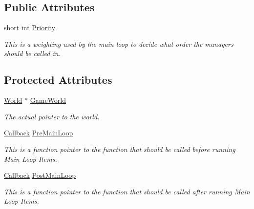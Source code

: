 \subsection*{Public Attributes}
\begin{DoxyCompactItemize}
\item 
short int \hyperlink{classphys_1_1ManagerBase_a28e2690fbcf644a7780a53b81821d8ef}{Priority}
\begin{DoxyCompactList}\small\item\em This is a weighting used by the main loop to decide what order the managers should be called in. \item\end{DoxyCompactList}\end{DoxyCompactItemize}
\subsection*{Protected Attributes}
\begin{DoxyCompactItemize}
\item 
\hyperlink{classphys_1_1World}{World} $\ast$ \hyperlink{classphys_1_1ManagerBase_ae2f158b4b2fef1bf2bee2524e0236c7b}{GameWorld}
\begin{DoxyCompactList}\small\item\em The actual pointer to the world. \item\end{DoxyCompactList}\item 
\hyperlink{classphys_1_1ManagerBase_a753f5f0127131529767beab2502f480b}{Callback} \hyperlink{classphys_1_1ManagerBase_a93eb2f1a30d913a4e99180b0965eb5db}{PreMainLoop}
\begin{DoxyCompactList}\small\item\em This is a function pointer to the function that should be called before running Main Loop Items. \item\end{DoxyCompactList}\item 
\hyperlink{classphys_1_1ManagerBase_a753f5f0127131529767beab2502f480b}{Callback} \hyperlink{classphys_1_1ManagerBase_aa1e80a30f151c07e06d1f4650f315da5}{PostMainLoop}
\begin{DoxyCompactList}\small\item\em This is a function pointer to the function that should be called after running Main Loop Items. \item\end{DoxyCompactList}\end{DoxyCompactItemize}


